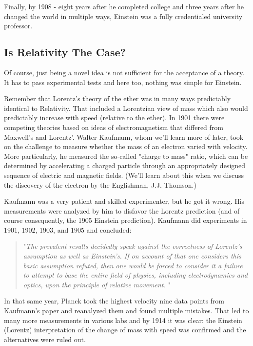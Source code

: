 \documentclass[
]{article}
\begin{document}
Finally, by 1908 - eight years after he completed college and three
years after he changed the world in multiple ways, Einstein was a fully
credentialed university professor.

\hypertarget{is-relativity-the-case}{%
\subsection{Is Relativity The Case?}\label{is-relativity-the-case}}

Of course, just being a novel idea is not sufficient for the acceptance
of a theory. It has to pass experimental tests and here too, nothing was
simple for Einstein.

Remember that Lorentz's theory of the ether was in many ways predictably
identical to Relativity. That included a Lorentzian view of mass which
also would predictably increase with speed (relative to the ether). In
1901 there were competing theories based on ideas of electromagnetism
that differed from Maxwell's and Lorentz'. Walter Kaufmann, whom we'll
learn more of later, took on the challenge to measure whether the mass
of an electron varied with velocity. More particularly, he measured the
so-called "charge to mass" ratio, which can be determined by
accelerating a charged particle through an appropriately designed
sequence of electric and magnetic fields. (We'll learn about this when
we discuss the discovery of the electron by the Englishman, J.J.
Thomson.)

Kaufmann was a very patient and skilled experimenter, but he got it
wrong. His measurements were analyzed by him to disfavor the Lorentz
prediction (and of course consequently, the 1905 Einstein prediction).
Kaufmann did experiments in 1901, 1902, 1903, and 1905 and concluded:

\begin{quote}
"\emph{The prevalent results decidedly speak against the correctness of
Lorentz's assumption as well as Einstein's. If on account of that one
considers this basic assumption refuted, then one would be forced to
consider it a failure to attempt to base the entire field of physics,
including electrodynamics and optics, upon the principle of relative
movement.} "
\end{quote}

In that same year, Planck took the highest velocity nine data points
from Kaufmann's paper and reanalyzed them and found multiple mistakes.
That led to many more measurements in various labs and by 1914 it was
clear: the Einstein (Lorentz) interpretation of the change of mass with
speed was confirmed and the alternatives were ruled out.
\end{document}
